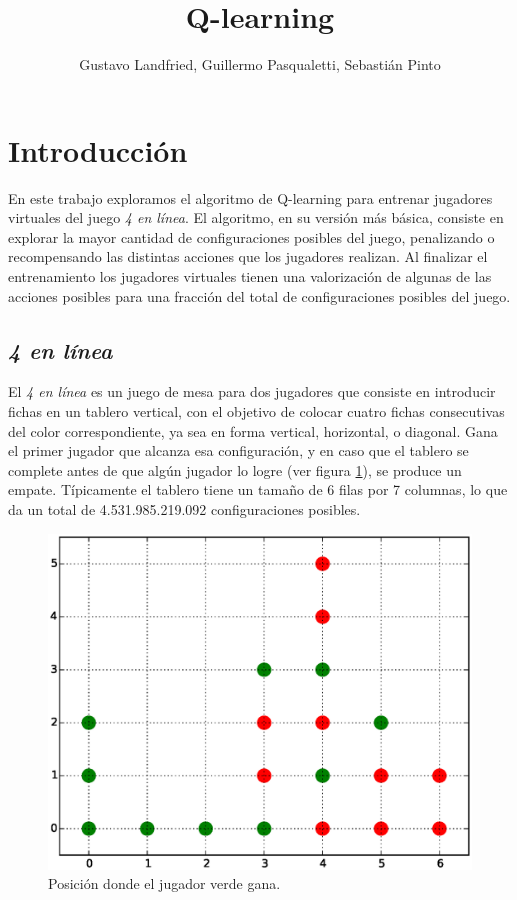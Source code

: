 \documentclass[11pt, spanish]{article}
\title{Q-learning}
\author{Gustavo Landfried, Guillermo Pasqualetti, Sebastián Pinto}
\begin{document}
\maketitle

\section{Introducción}
\par En este trabajo exploramos el algoritmo de Q-learning para entrenar 
jugadores virtuales del juego \emph{4 en línea}. El algoritmo, en su versión 
más básica, consiste en explorar la mayor cantidad de configuraciones 
posibles del juego, penalizando o recompensando las distintas acciones 
que los jugadores realizan. Al finalizar el 
entrenamiento los jugadores virtuales tienen una valorización de algunas de las 
acciones posibles para una fracción del total de configuraciones posibles del 
juego. 

\subsection{\emph{4 en línea}}

\par El \emph{4 en línea} es un juego de mesa para dos jugadores que consiste 
en introducir fichas en un tablero vertical, con el objetivo de colocar cuatro 
fichas consecutivas del color correspondiente, ya sea en forma vertical, 
horizontal, o diagonal. Gana el primer jugador que alcanza esa configuración, y 
en caso que el tablero se complete antes de que algún jugador lo logre 
(ver figura \ref{fig:tablero}), se produce un empate. 
Típicamente el tablero tiene un tamaño de 6 filas por 7 columnas, lo que da un 
total de 4.531.985.219.092 configuraciones posibles.
\begin{figure}
\centering
\includegraphics[scale = 0.5]{figuras/Tablero.eps}
\caption{Posición donde el jugador verde gana.}
\label{fig:tablero}
\end{figure}
\end{document}
